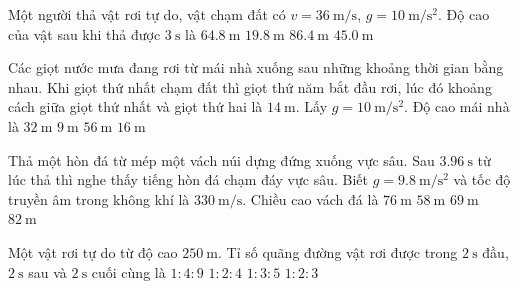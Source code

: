 \begin{ex}
	Một người thả vật rơi tự do, vật chạm đất có $v=\SI{36}{\meter/\second}$, $g=\SI{10}{\meter/\second^2}$. Độ cao của vật sau khi thả được $\SI{3}{\second}$ là
	\choice
	{$\SI{64.8}{\meter}$}
	{\True $\SI{19.8}{\meter}$}
	{$\SI{86.4}{\meter}$}
	{$\SI{45.0}{\meter}$}
\end{ex}

\begin{ex}
	Các giọt nước mưa đang rơi từ mái nhà xuống sau những khoảng thời gian bằng nhau. Khi giọt thứ nhất chạm đất thì giọt thứ năm bắt đầu rơi, lúc đó khoảng cách giữa giọt thứ nhất và giọt thứ hai là $\SI{14}{\meter}$. Lấy $g=\SI{10}{\meter/\second^2}$. Độ cao mái nhà là
	\choice
	{\True $\SI{32}{\meter}$}
	{$\SI{9}{\meter}$}
	{$\SI{56}{\meter}$}
	{$\SI{16}{\meter}$}
\end{ex}

\begin{ex}
	Thả một hòn đá từ mép một vách núi dựng đứng xuống vực sâu. Sau $\SI{3.96}{\second}$ từ lúc thả thì nghe thấy tiếng hòn đá chạm đáy vực sâu. Biết $g=\SI{9.8}{\meter/\second^2}$ và tốc độ truyền âm trong không khí là $\SI{330}{\meter/\second}$. Chiều cao vách đá là
	\choice
	{$\SI{76}{\meter}$}
	{$\SI{58}{\meter}$}
	{\True $\SI{69}{\meter}$}
	{$\SI{82}{\meter}$}
\end{ex}

\begin{ex}
	Một vật rơi tự do từ độ cao $250\ \text{m}$. Tỉ số quãng đường vật rơi được trong $2\ \text{s}$ đầu, $2\ \text{s}$ sau và $2\ \text{s}$ cuối cùng là
	\choice
	{$1:4:9$}
	{$1:2:4$}
	{\True $1:3:5$}
	{$1:2:3$}
\end{ex}

